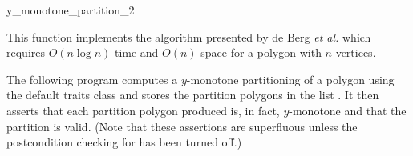 \begin{ccRefFunction}{y_monotone_partition_2}
\ccImplementation

This function implements the algorithm presented by de Berg \textit{et al.}
\cite{bkos-cgaa-97} which requires $O(n \log n)$ time
and $O(n)$ space for a polygon with $n$ vertices.

\ccExample


The following program computes a $y$-monotone partitioning
of a polygon using the default
traits class and stores the partition polygons in the list 
.  It then asserts that each partition polygon
produced is, in fact, $y$-monotone and that the partition is valid.
(Note that these assertions are superfluous unless the postcondition
checking for  has been turned off.)




\end{ccRefFunction}
